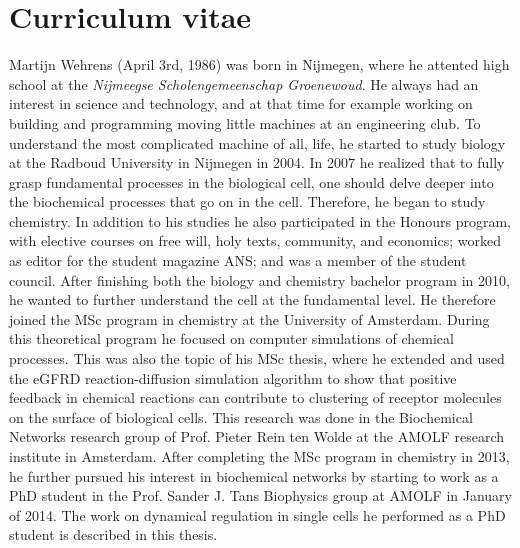 


\chapter*{Curriculum vitae}


Martijn Wehrens (April 3rd, 1986) was born in Nijmegen, where he attented high school 
at the \textit{Nijmeegse Scholengemeenschap Groenewoud}.
%
He always had an interest in science and technology, 
and at that time for example working on building and programming moving little machines at an engineering club.
%
To understand the most complicated machine of all, life, he started to study biology at the Radboud University in Nijmegen in 2004.
%
In 2007 he realized that to fully grasp fundamental processes in the biological cell, 
one should delve deeper into the biochemical processes that go on in the cell.
%
Therefore, he began to 
study chemistry. 
%
In addition to his studies he also participated in the Honours program, with elective courses on free will, holy texts, community, and economics; 
worked as editor for the student magazine ANS; and was a member of the student council.
%
After finishing both the biology and chemistry bachelor program in 2010, he wanted to further understand the cell at the fundamental level.
%
He therefore joined the MSc program in chemistry at the University of Amsterdam.
%
During this theoretical program he focused on computer simulations of chemical processes.
%
This was also the topic of his MSc thesis, where he extended and used the eGFRD reaction-diffusion simulation algorithm to show that 
positive feedback in chemical reactions can contribute to clustering of receptor molecules on the surface of biological cells. 
%
This research was done in the Biochemical Networks research group of Prof. Pieter Rein ten Wolde at the AMOLF research institute in Amsterdam.
%
After completing the MSc program in chemistry in 2013, he further pursued his interest in biochemical networks 
by starting to work as a PhD student in the Prof. Sander J. Tans Biophysics group at AMOLF in January of 2014. 
%
The work on dynamical regulation in single cells he performed as a PhD student is described in this thesis.




